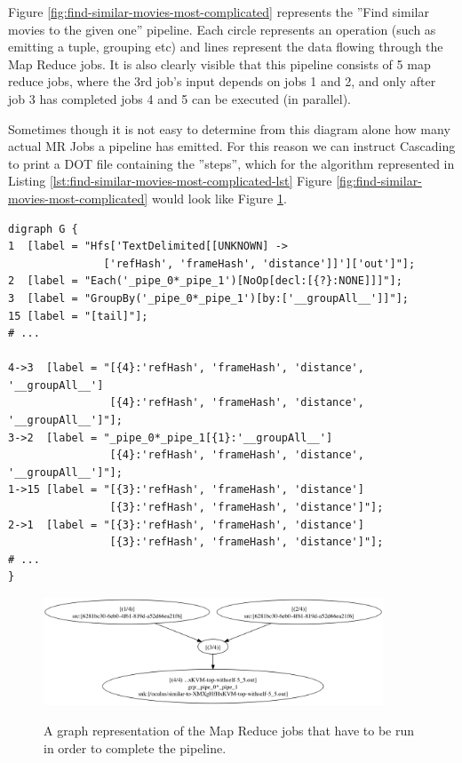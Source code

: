 Figure \ref{fig:find-similar-movies-most-complicated} represents the ''Find similar movies to the given one'' pipeline. Each circle represents an operation (such as emitting a tuple, grouping etc) and lines represent the data flowing through the Map Reduce jobs. It is also clearly visible that this pipeline consists of 5 map reduce jobs, where the 3rd job's input depends on jobs 1 and 2, and only after job 3 has completed jobs 4 and 5 can be executed (in parallel).

Sometimes though it is not easy to determine from this diagram alone how many actual MR Jobs a pipeline has emitted. For this reason we can instruct Cascading to print a DOT file containing the ''steps'', which for the algorithm represented in Listing \ref{lst:find-similar-movies-most-complicated-lst} Figure \ref{fig:find-similar-movies-most-complicated} would look like Figure \ref{fig:find-similar-movies-most-complicated-steps}.

\begin{lstlisting}[caption={Fragments of FindMostSimilarMoviesJob.dot}, label={lst:find-similar-movies-most-complicated-lst}]
digraph G {
1  [label = "Hfs['TextDelimited[[UNKNOWN] -> 
               ['refHash', 'frameHash', 'distance']]']['out']"];
2  [label = "Each('_pipe_0*_pipe_1')[NoOp[decl:[{?}:NONE]]]"];
3  [label = "GroupBy('_pipe_0*_pipe_1')[by:['__groupAll__']]"];
15 [label = "[tail]"];
# ...
    
4->3  [label = "[{4}:'refHash', 'frameHash', 'distance', '__groupAll__']
                [{4}:'refHash', 'frameHash', 'distance', '__groupAll__']"];
3->2  [label = "_pipe_0*_pipe_1[{1}:'__groupAll__']
                [{4}:'refHash', 'frameHash', 'distance', '__groupAll__']"];
1->15 [label = "[{3}:'refHash', 'frameHash', 'distance']
                [{3}:'refHash', 'frameHash', 'distance']"];
2->1  [label = "[{3}:'refHash', 'frameHash', 'distance']
                [{3}:'refHash', 'frameHash', 'distance']"];
# ...
}
\end{lstlisting}


\begin{figure}[ch!]
  \centering
  \includegraphics[width=0.9\textwidth]{img/FindSimilarMoviesV2Job-steps_dot.png}
  \label{fig:find-similar-movies-most-complicated-steps}
  \caption{A graph representation of the Map Reduce jobs that have to be run in order to complete the pipeline.}
\end{figure}

